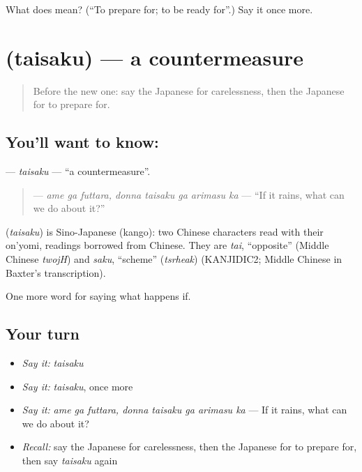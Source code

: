 \begin{tcolorbox}[breakable,colback=teal!4,colframe=teal!35!black,title={Before you move on}]
What does  mean? (\textquotedblleft{}To prepare for; to be ready for\textquotedblright{}.) Say it once more.
\end{tcolorbox}
\section[\texorpdfstring{\ja{たいさく} (taisaku)}{たいさく (taisaku)}]{ (taisaku) — a countermeasure}

\label{lesson:JA-C350-taisaku}



\begin{quote}
Before the new one: say the Japanese for carelessness, then the Japanese for to prepare for.
\end{quote}

\subsection*{You'll want to know: }
\textbf{} — \emph{taisaku} — \textquotedblleft{}a countermeasure\textquotedblright{}.

\begin{quote}
\textbf{   } — \emph{ame ga futtara, donna taisaku ga arimasu ka} — \textquotedblleft{}If it rains, what can we do about it?\textquotedblright{}
\end{quote}

\begin{cousinweb}
\textbf{} (\emph{taisaku}) is Sino-Japanese (kango): two Chinese characters read with their on'yomi, readings borrowed from Chinese. They are \emph{tai}, \textquotedblleft{}opposite\textquotedblright{} (Middle Chinese \emph{twojH}) and \emph{saku}, \textquotedblleft{}scheme\textquotedblright{} (\emph{tsrheak}) (KANJIDIC2; Middle Chinese in Baxter's transcription).
\end{cousinweb}

\begin{grammarlens}[title={What you've built}]
One more word for saying what happens if.
\end{grammarlens}

\subsection*{Your turn}
\begin{itemize}
\raggedright
  \item \emph{Say it:} \emph{taisaku}
  \item \emph{Say it:} \emph{taisaku}, once more
  \item \emph{Say it:} \emph{ame ga futtara, donna taisaku ga arimasu ka} — If it rains, what can we do about it?
  \item \emph{Recall:} say the Japanese for carelessness, then the Japanese for to prepare for, then say \emph{taisaku} again
\end{itemize}

